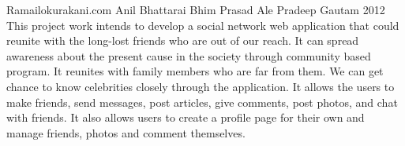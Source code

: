  \begin{conf-abstract}[]
{Ramailokurakani.com}
{
Anil Bhattarai
Bhim Prasad Ale
Pradeep Gautam
}	
{2012}
This project work intends to develop a social network web application that could reunite 
with the long-lost friends who are out of our reach. It can spread awareness about the 
present cause in the society through community based program. It reunites with
family members who are far from them. We can get chance to know celebrities closely 
through the application. It allows the users to make friends, send messages, post
articles, give comments, post photos, and chat with friends. It also allows users to create a profile page for their own and manage friends, photos and comment themselves.
  \end{conf-abstract}